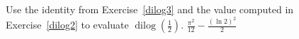 {Use the identity from Exercise~\ref{dilog3} and the value computed in Exercise~\ref{dilog2} to evaluate $\operatorname{dilog}\left(\frac{1}{2}\right)$.
}
{$\frac{\pi^2}{12} - \frac{(\ln 2)^2}{2}$
}